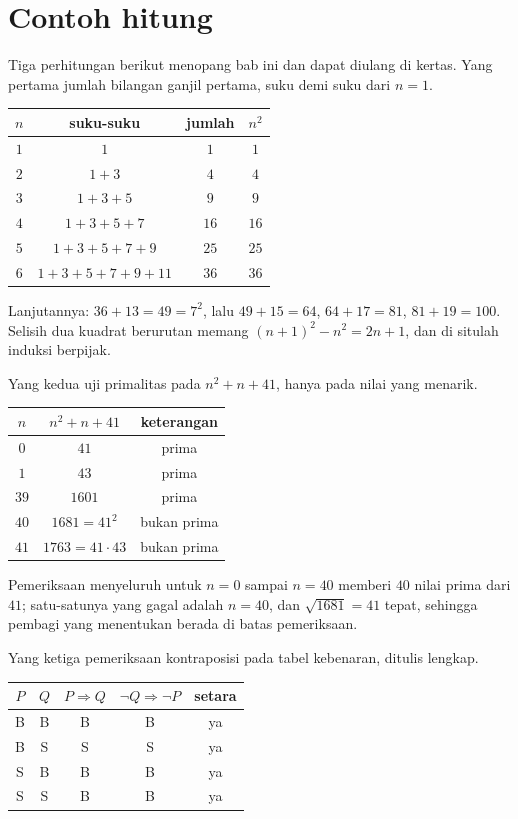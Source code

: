 \section{Contoh hitung}

Tiga perhitungan berikut menopang bab ini dan dapat diulang di kertas. Yang pertama
jumlah bilangan ganjil pertama, suku demi suku dari $n = 1$.

{\centering
\begin{tabular}{cccc}
\hline
$n$ & suku-suku & jumlah & $n^{2}$ \\
\hline
$1$ & $1$ & $1$ & $1$ \\
$2$ & $1+3$ & $4$ & $4$ \\
$3$ & $1+3+5$ & $9$ & $9$ \\
$4$ & $1+3+5+7$ & $16$ & $16$ \\
$5$ & $1+3+5+7+9$ & $25$ & $25$ \\
$6$ & $1+3+5+7+9+11$ & $36$ & $36$ \\
\hline
\end{tabular}\par}

Lanjutannya: $36+13 = 49 = 7^{2}$, lalu $49+15 = 64$, $64+17 = 81$, $81+19 = 100$.
Selisih dua kuadrat berurutan memang $(n+1)^{2}-n^{2} = 2n+1$, dan di situlah induksi
berpijak.

Yang kedua uji primalitas pada $n^{2}+n+41$, hanya pada nilai yang menarik.

{\centering
\begin{tabular}{ccc}
\hline
$n$ & $n^{2}+n+41$ & keterangan \\
\hline
$0$ & $41$ & prima \\
$1$ & $43$ & prima \\
$39$ & $1601$ & prima \\
$40$ & $1681 = 41^{2}$ & bukan prima \\
$41$ & $1763 = 41 \cdot 43$ & bukan prima \\
\hline
\end{tabular}\par}

Pemeriksaan menyeluruh untuk $n = 0$ sampai $n = 40$ memberi $40$ nilai prima dari $41$;
satu-satunya yang gagal adalah $n = 40$, dan $\sqrt{1681} = 41$ tepat, sehingga pembagi
yang menentukan berada di batas pemeriksaan.

Yang ketiga pemeriksaan kontraposisi pada tabel kebenaran, ditulis lengkap.

{\centering
\begin{tabular}{cc|cc|c}
\hline
$P$ & $Q$ & $P \Rightarrow Q$ & $\neg Q \Rightarrow \neg P$ & setara \\
\hline
B & B & B & B & ya \\
B & S & S & S & ya \\
S & B & B & B & ya \\
S & S & B & B & ya \\
\hline
\end{tabular}\par}


